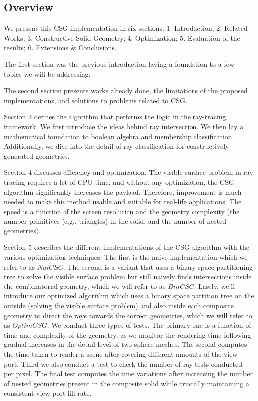 \documentclass[a4paper,11pt,oneside]{article}
\begin{document}
\subsection{Overview}
  
We present this CSG implementation in six sections. 1. Introduction;  2. Related Works; 3. Constructive Solid Geometry; 4. Optimization; 5. Evaluation of the results; 6. Extensions \& Conclusions.

The first section was the previous introduction laying a foundation to a few topics we will be addressing. 
  
The second section presents works already done, the limitations of the proposed implementations, and solutions to problems related to CSG.
  
Section 3 defines the algorithm that performs the logic in the ray-tracing framework. We first introduce the ideas behind ray intersection. We then lay a mathematical foundation to boolean algebra and membership classification. Additionally, we dive into the detail of ray classification for constructively generated geometries. 
  
Section 4 discusses efficiency and optimization. The visible surface problem in ray tracing requires a lot of CPU time, and without any optimization, the CSG algorithm significantly increases the payload. Therefore, improvement is much needed to make this method usable and suitable for real-life applications. The speed is a function of the screen resolution and the geometry complexity (the number primitives (e.g., triangles) in the solid, and the number of nested geometries).
  
Section 5 describes the different implementations of the CSG algorithm with the various optimization techniques. The first is the naive implementation which we refer to as $NaiCSG$. The second is a variant that uses a binary space partitioning tree to solve the visible surface problem but still naively finds intersections inside the combinatorial geometry, which we will refer to as $BinCSG$. Lastly, we'll introduce our optimized algorithm which uses a binary space partition tree on the outside (solving the visible surface problem) and also inside each composite geometry to direct the rays towards the correct geometries, which we will refer to as $OptimCSG$. We conduct three types of tests. The primary one is a function of time and complexity of the geometry, as we monitor the rendering time following gradual increases in the detail level of two sphere meshes. The second computes the time taken to render a scene after covering different amounts of the view port. Third we also conduct a test to check the number of ray tests conducted per pixel. The final test computes the time variations after increasing the number of nested geometries present in the composite solid while crucially maintaining a consistent view port fill rate.
  
\end{document}
